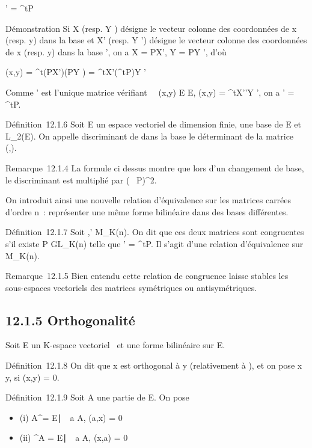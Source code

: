 \documentclass[]{article}
\begin{document}
\Omega' = ^tP\OmegaP

Démonstration Si X (resp. Y ) désigne le vecteur colonne des coordonnées
de x (resp. y) dans la base  et X' (resp. Y ') désigne le vecteur
colonne des coordonnées de x (resp. y) dans la base ', on a X = PX', Y
= PY ', d'où

\phi(x,y) = ^t(PX')\Omega(PY ) = ^tX'(^tP\OmegaP)Y '

Comme \Omega' est l'unique matrice vérifiant \forall~~(x,y)
\in E \times E, \phi(x,y) = ^tX'\Omega'Y ', on a \Omega' = ^tP\OmegaP.

Définition~12.1.6 Soit E un espace vectoriel de dimension finie,  une
base de E et \phi \in L_2(E). On appelle discriminant de \phi dans la
base  le déterminant de la matrice
\mathrmMat~ (\phi,).

Remarque~12.1.4 La formule ci dessus montre que lors d'un changement de
base, le discriminant est multiplié par
(~
P)^2.

On introduit ainsi une nouvelle relation d'équivalence sur les matrices
carrées d'ordre n~: représenter une même forme bilinéaire dans des bases
différentes.

Définition~12.1.7 Soit \Omega,\Omega' \in M_K(n). On dit que ces deux
matrices sont congruentes s'il existe P \in GL_K(n) telle que \Omega'
= ^tP\OmegaP. Il s'agit d'une relation d'équivalence sur
M_K(n).

Remarque~12.1.5 Bien entendu cette relation de congruence laisse stables
les sous-espaces vectoriels des matrices symétriques ou antisymétriques.

\subsection{12.1.5 Orthogonalité}

Soit E un K-espace vectoriel ~et \phi une forme bilinéaire sur E.

Définition~12.1.8 On dit que x est orthogonal à y (relativement à \phi), et
on pose x \bot y, si \phi(x,y) = 0.

Définition~12.1.9 Soit A une partie de E. On pose

\begin{itemize}
\itemsep1pt\parskip0pt
\item
  (i) A^\bot = \x \in
  E∣\forall~~a \in A, \phi(a,x)
  = 0\
\item
  (ii) ^\bot A = \x \in
  E∣\forall~~a \in A, \phi(x,a)
  = 0\
\end{itemize}
\end{document}
